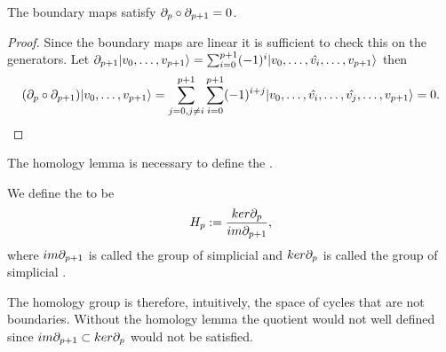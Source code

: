 \documentclass[../1.tex]{subfiles}
\begin{document}
    \begin{lem}
        The boundary maps satisfy $\partial_p \circ \partial_{p+1} = 0$.
    \end{lem}
    \begin{proof}
        Since the boundary maps are linear it is sufficient to check this on the generators.
        Let $\partial_{p+1}| v_0,\dots,v_{p+1} \rangle = \sum_{i=0}^{p+1} (-1)^i| v_0,\dots,\hat{v_i},\dots,v_{p+1} \rangle$ then 
        \[(\partial_p \circ \partial_{p+1})| v_0,\dots,v_{p+1} \rangle = \sum_{j=0, j \neq i}^{p+1} \sum_{i=0}^{p+1} (-1)^{i+j}| v_0,\dots,\hat{v_i},\dots,\hat{v_j},\dots,v_{p+1} \rangle = 0. \qedhere \]     
    \end{proof}

    The homology lemma is necessary to define the .

    \begin{defn}
        We define the  to be 
        \[H_p := \frac{ker\partial_p}{im\partial_{p+1}},\] 
        where $im\partial_{p+1}$ is called the group of simplicial  and
        $ker\partial_p$ is called the group of simplicial .
    \end{defn}

    The homology group is therefore, intuitively,  the space of cycles that are not boundaries. Without the
    homology lemma the quotient would not well defined since $im\partial_{p+1} \subset ker\partial_p$ would not be satisfied.
\end{document}
